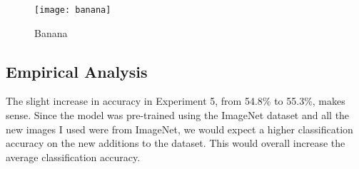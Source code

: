\begin{figure}
    \texttt{[image: banana]}
    \caption{Banana}
    \label{fig:banana}
\end{figure}

\subsection*{Empirical Analysis}
The slight increase in accuracy in Experiment 5, from 54.8\% to 55.3\%, makes
sense. Since the model was pre-trained using the ImageNet dataset and all the
new images I used were from ImageNet, we would expect a higher classification
accuracy on the new additions to the dataset. This would overall increase the
average classification accuracy.
